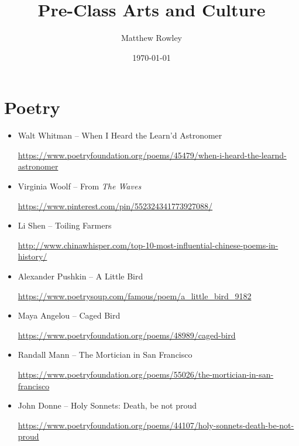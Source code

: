 \documentclass[12pt, openany, letterpaper]{memoir}
\begin{document}
\title{Pre-Class Arts and Culture}
\author{Matthew Rowley}
\date{\today}
\mainmatter
\maketitle
\chapter{Poetry}
\begin{itemize}
	\item Walt Whitman -- When I Heard the Learn’d Astronomer 
	
	 \hyperref[https://www.poetryfoundation.org/poems/45479/when-i-heard-the-learnd-astronomer]{https://www.poetryfoundation.org/poems/45479/when-i-heard-the-learnd-astronomer}
	 
	\item Virginia Woolf -- From \emph{The Waves}
	
	\hyperref[https://www.pinterest.com/pin/552324341773927088/]{https://www.pinterest.com/pin/552324341773927088/}
	
	\item Li Shen -- Toiling Farmers
	
	\hyperref[http://www.chinawhisper.com/top-10-most-influential-chinese-poems-in-history/]{http://www.chinawhisper.com/top-10-most-influential-chinese-poems-in-history/}
	
	\item Alexander Pushkin -- A Little Bird
	
	\hyperref[https://www.poetrysoup.com/famous/poem/a_little_bird_9182]{https://www.poetrysoup.com/famous/poem/a\_little\_bird\_9182}
	
	\item Maya Angelou -- Caged Bird
	
	\hyperref[https://www.poetryfoundation.org/poems/48989/caged-bird]{https://www.poetryfoundation.org/poems/48989/caged-bird}
	
	\item Randall Mann -- The Mortician in San Francisco
	
	\hyperref[https://www.poetryfoundation.org/poems/55026/the-mortician-in-san-francisco]{https://www.poetryfoundation.org/poems/55026/the-mortician-in-san-francisco}
	
	\item John Donne -- Holy Sonnets: Death, be not proud
	
	\hyperref[https://www.poetryfoundation.org/poems/44107/holy-sonnets-death-be-not-proud]{https://www.poetryfoundation.org/poems/44107/holy-sonnets-death-be-not-proud}
	

\end{itemize}
\end{document}
